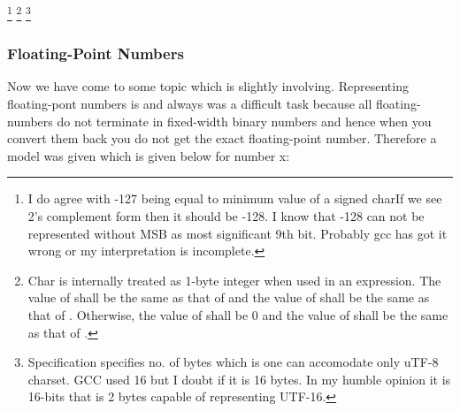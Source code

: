 \footnote[1]{I do agree with -127 being equal to minimum value of a \type
{signed char}If we see 2's complement form then it should be -128. I
know that -128 can not be represented without MSB as most significant
9th bit. Probably gcc has got it wrong or my interpretation is incomplete.}
\footnote[2]{Char is internally treated as 1-byte integer when used in
  an expression. The value of  shall be the same as that of
   and the value of  shall be the same as that of
  . Otherwise, the value of  shall be 0 and the
  value of  shall be the same as that of .}
\footnote[3]{Specification specifies no. of bytes which is one can
  accomodate only uTF-8 charset. GCC used 16 but I doubt if it is
  16 bytes. In my humble opinion it is 16-bits that is 2 bytes capable
  of representing UTF-16.}

\subsubsection{Floating-Point Numbers}
Now we have come to some topic which is slightly
involving. Representing floating-pont numbers is and always was a
difficult task because all floating-numbers do not terminate in
fixed-width binary numbers and hence when you convert them back you do
not get the exact floating-point number. Therefore a model was given
which is given below for number x:


